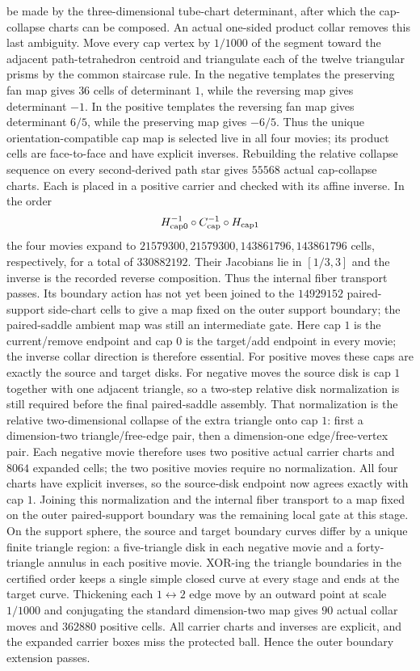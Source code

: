 \documentclass[11pt]{amsart}
\theoremstyle{definition}
\theoremstyle{remark}
\begin{document}
be made by the three-dimensional tube-chart determinant, after which the
cap-collapse charts can be composed.
An actual one-sided product collar removes this last ambiguity.  Move every
cap vertex by $1/1000$ of the segment toward the adjacent path-tetrahedron
centroid and triangulate each of the twelve triangular prisms by the common
staircase rule.  In the negative templates the preserving fan map gives $36$
cells of determinant $1$, while the reversing map gives determinant $-1$.  In
the positive templates the reversing fan map gives determinant $6/5$, while
the preserving map gives $-6/5$.  Thus the unique orientation-compatible cap
map is selected live in all four movies; its product cells are face-to-face and
have explicit inverses.  Rebuilding the relative collapse sequence on every
second-derived path star gives $55568$ actual cap-collapse charts.  Each is
placed in a positive carrier and checked with its affine inverse.  In the order
\begin{equation*}
H_{\rm cap0}^{-1}\circ C_{\rm cap}^{-1}\circ H_{\rm cap1}
\end{equation*}
the four movies expand to $21579300,21579300,143861796,143861796$ cells,
respectively, for a total of $330882192$.  Their Jacobians lie in $[1/3,3]$
and the inverse is the recorded reverse composition.  Thus the internal fiber
transport passes.  Its boundary action has not yet been joined to the
$14929152$ paired-support side-chart cells to give a map fixed on the outer
support boundary; the paired-saddle ambient map was still an intermediate gate.
Here cap $1$ is the current/remove endpoint and cap $0$ is the target/add
endpoint in every movie; the inverse collar direction is therefore essential.
For positive moves these caps are exactly the source and target disks.  For
negative moves the source disk is cap $1$ together with one adjacent triangle,
so a two-step relative disk normalization is still required before the final
paired-saddle assembly.
That normalization is the relative two-dimensional collapse of the extra
triangle onto cap $1$: first a dimension-two triangle/free-edge pair, then a
dimension-one edge/free-vertex pair.  Each negative movie therefore uses two
positive actual carrier charts and $8064$ expanded cells; the two positive
movies require no normalization.  All four charts have explicit inverses, so
the source-disk endpoint now agrees exactly with cap $1$.  Joining this
normalization and the internal fiber transport to a map fixed on the outer
paired-support boundary was the remaining local gate at this stage.
On the support sphere, the source and target boundary curves differ by a
unique finite triangle region: a five-triangle disk in each negative movie and
a forty-triangle annulus in each positive movie.  XOR-ing the triangle
boundaries in the certified order keeps a single simple closed curve at every
stage and ends at the target curve.  Thickening each $1\leftrightarrow2$
edge move by an outward point at scale $1/1000$ and conjugating the standard
dimension-two map gives $90$ actual collar moves and $362880$ positive cells.
All carrier charts and inverses are explicit, and the expanded carrier boxes
miss the protected ball.  Hence the outer boundary extension passes.
\end{document}
